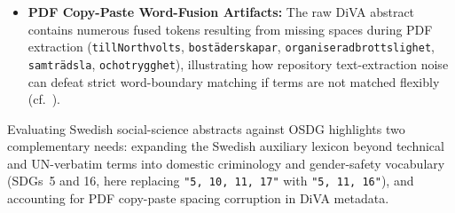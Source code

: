 \begin{casestudySection}
\begin{itemize}
    \item \textbf{PDF Copy-Paste Word-Fusion Artifacts:} The raw \gls{DiVA} abstract contains numerous fused tokens resulting from missing spaces during PDF extraction (\eg \texttt{tillNorthvolts}, \texttt{bostäderskapar}, \texttt{organiseradbrottslighet}, \texttt{samträdsla}, \texttt{ochotrygghet}), illustrating how repository text-extraction noise can defeat strict word-boundary matching if terms are not matched flexibly (cf.\ ).
\end{itemize}
\end{casestudySection}

\begin{takeaway}
Evaluating Swedish social-science abstracts against OSDG highlights two complementary needs: expanding the Swedish auxiliary lexicon beyond technical and \gls{UN}-verbatim terms into domestic criminology and gender-safety vocabulary (\glspl{SDG}~5 and 16, here replacing \texttt{"5, 10, 11, 17"} with \texttt{"5, 11, 16"}), and accounting for PDF copy-paste spacing corruption in \gls{DiVA} metadata.
\end{takeaway}


